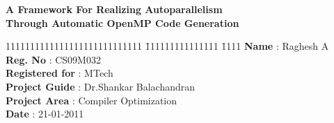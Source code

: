 \documentclass[a4paper,10pt]{article}
\begin{document}
\begin{center}
{\bf A Framework For Realizing Autoparallelism\\ Through Automatic OpenMP Code Generation}\\
\end{center}
  \begin{tabbing}
      1111111111111111111111111111 \= 111111111111111 \= 1111\kill
   {\bf Name} \> : Raghesh A\\
   {\bf Reg. No} \> : CS09M032\\
   {\bf Registered for} \> : MTech\\
   {\bf Project Guide} \> : Dr.Shankar Balachandran \\
   {\bf Project Area} \> :  Compiler Optimization\\
   {\bf Date} \> :  21-01-2011\\
  \end{tabbing} 
\begin{abstract}
A framework for automatically generating OpenMP code after detecting parallelism
in programs is proposed. The approach is independent of the programming language.
A performance similar to that of a program which has OpenMP
pragmas provided by the user is observed. It is expected to get more performance
with the integration of profile guided optimization into this.
\end{abstract}
\end{document}

